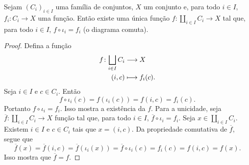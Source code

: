 \begin{proposition}
Sejam $(C_i)_{i \in I}$ uma família de conjuntos, $X$ um conjunto e, para todo $i \in I$, $f_i: C_i \to X$ uma função. Então existe uma única função $f: \coprod_{i \in I} C_i \to X$ tal que, para todo $i \in I$, $f \circ \iota_i = f_i$ (o diagrama comuta).
\begin{figure}
\centering
{}
\end{figure}
\end{proposition}
\begin{proof}
Defina a função
	\begin{align*}
	{f}\colon {\bigsqcup_{i \in I} C_i} &\longrightarrow {X} \\{(i,c)} &\longmapsto f_i(c).
	\end{align*}
Seja $i \in I$ e $c \in C_i$. Então
	\begin{equation*}
	f \circ \iota_i(c) = f(\iota_i(c)) = f(i,c) = f_i(c).
	\end{equation*}
Portanto $f \circ \iota_i = f_i$. Isso mostra a existência da $f$. Para a unicidade, seja $\overline{f}: \coprod_{i \in I} C_i \to X$ função tal que, para todo $i \in I$, $\overline{f} \circ \iota_i = f_i$. Seja $x \in \coprod_{i \in I} C_i$. Existem $i \in I$ e $c \in C_i$ tais que $x=(i,c)$. Da propriedade comutativa de $\overline{f}$, segue que
	\begin{equation*}
	\overline{f}(x) = \overline{f}(i,c) = \overline{f}(\iota_i(x)) = \overline{f} \circ \iota_i(c) = f_i(c) = f(i,c) = f(x).
	\end{equation*}
Isso mostra que $\overline{f}=f$.
\end{proof}







